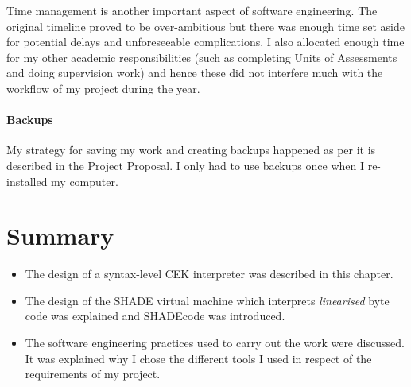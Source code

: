 \documentclass[class=article, crop=false]{standalone}
\begin{document}
Time management is another important aspect of software engineering. The original
timeline proved to be over-ambitious but there was enough time set aside for
potential delays and unforeseeable complications. I also allocated enough time
for my other academic responsibilities (such as completing Units of Assessments
and doing supervision work) and hence these did not interfere much with the
workflow of my project during the year.

\paragraph{Backups}

My strategy for saving my work and creating backups happened as per it is
described in the Project Proposal. I only had to use backups once when I
re-installed my computer.

\section{Summary}
\begin{itemize}
\item The design of a syntax-level CEK interpreter was described in this chapter.
\item The design of the SHADE virtual machine which interprets \emph{linearised}
byte code was explained and SHADEcode was introduced.
\item The software engineering practices used to carry out the work were discussed.
It was explained why I chose the different tools I used in respect of the
requirements of my project.
\end{itemize}
\end{document}
